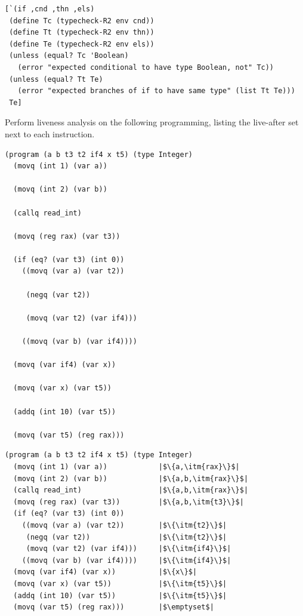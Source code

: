 \documentclass[12pt]{exam}
\newcommand{\itm}[1]{\ensuremath{\mathit{#1}}}
\begin{document}
\begin{questions}
\begin{solution}
\begin{lstlisting}
[`(if ,cnd ,thn ,els)
 (define Tc (typecheck-R2 env cnd))
 (define Tt (typecheck-R2 env thn))
 (define Te (typecheck-R2 env els))
 (unless (equal? Tc 'Boolean)
   (error "expected conditional to have type Boolean, not" Tc))
 (unless (equal? Tt Te)
   (error "expected branches of if to have same type" (list Tt Te)))
 Te]
\end{lstlisting}
\end{solution}

\question[14] Perform liveness analysis on the following programming,
listing the live-after set next to each instruction.

\begin{lstlisting}
(program (a b t3 t2 if4 x t5) (type Integer)
  (movq (int 1) (var a))

  (movq (int 2) (var b))

  (callq read_int)

  (movq (reg rax) (var t3))

  (if (eq? (var t3) (int 0))
    ((movq (var a) (var t2))

     (negq (var t2))

     (movq (var t2) (var if4)))

    ((movq (var b) (var if4))))

  (movq (var if4) (var x))

  (movq (var x) (var t5))

  (addq (int 10) (var t5))

  (movq (var t5) (reg rax)))
\end{lstlisting}

\begin{solution}
\begin{lstlisting}
(program (a b t3 t2 if4 x t5) (type Integer)
  (movq (int 1) (var a))            |$\{a,\itm{rax}\}$|
  (movq (int 2) (var b))            |$\{a,b,\itm{rax}\}$|
  (callq read_int)                  |$\{a,b,\itm{rax}\}$|
  (movq (reg rax) (var t3))         |$\{a,b,\itm{t3}\}$|
  (if (eq? (var t3) (int 0))
    ((movq (var a) (var t2))        |$\{\itm{t2}\}$|
     (negq (var t2))                |$\{\itm{t2}\}$|
     (movq (var t2) (var if4)))     |$\{\itm{if4}\}$|
    ((movq (var b) (var if4))))     |$\{\itm{if4}\}$|
  (movq (var if4) (var x))          |$\{x\}$|
  (movq (var x) (var t5))           |$\{\itm{t5}\}$|
  (addq (int 10) (var t5))          |$\{\itm{t5}\}$|
  (movq (var t5) (reg rax)))        |$\emptyset$|
\end{lstlisting}
\end{solution}


\end{questions}
\end{document}
